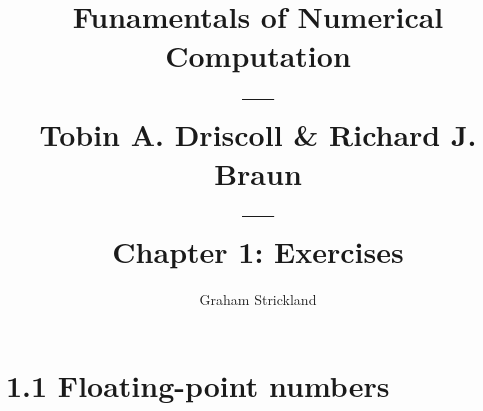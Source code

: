 \documentclass{article}
\title{
    Funamentals of Numerical Computation\\---\\Tobin A. Driscoll \& Richard J. Braun
    \\---\\Chapter 1: Exercises
}
\author{Graham Strickland}
\begin{document}
\maketitle  

\section*{1.1 Floating-point numbers}

\end{document}
